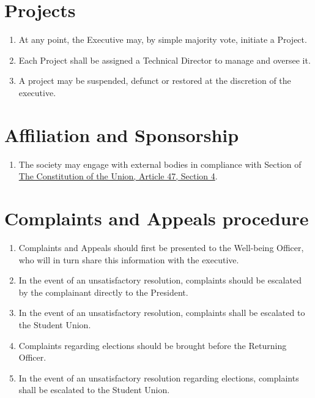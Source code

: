 \documentclass[parskip=half]{scrartcl}
\begin{document}
    \clearpage
    \section{Projects}
        \label{project}
        \begin{enumerate}
            \item At any point, the Executive may, by simple majority vote, initiate a Project.

            \item Each Project shall be assigned a Technical Director to manage and oversee it.

            \item A project may be suspended, defunct or restored at the discretion of the executive.
        \end{enumerate}

    \clearpage
    \section{Affiliation and Sponsorship}
        \label{affiliation}
        \begin{enumerate}
            \item The society may engage with external bodies in compliance with Section of \href{https://lancastersu.co.uk/resources/articles-of-association-2023/download_attachment}{The Constitution of the Union, Article 47, Section 4}.
        \end{enumerate}
    \clearpage
    \section{Complaints and Appeals procedure}
        \label{complaints-appeals}
        \begin{enumerate}
            \item Complaints and Appeals should first be presented to the Well-being Officer, who will in turn share this information with the executive.
            \item In the event of an unsatisfactory resolution, complaints should be escalated by the complainant directly to the President.
            \item In the event of an unsatisfactory resolution, complaints shall be escalated to the Student Union.
            \item Complaints regarding elections should be brought before the Returning Officer.
            \item In the event of an unsatisfactory resolution regarding elections, complaints shall be escalated to the Student Union.
 
        \end{enumerate}
\end{document}
